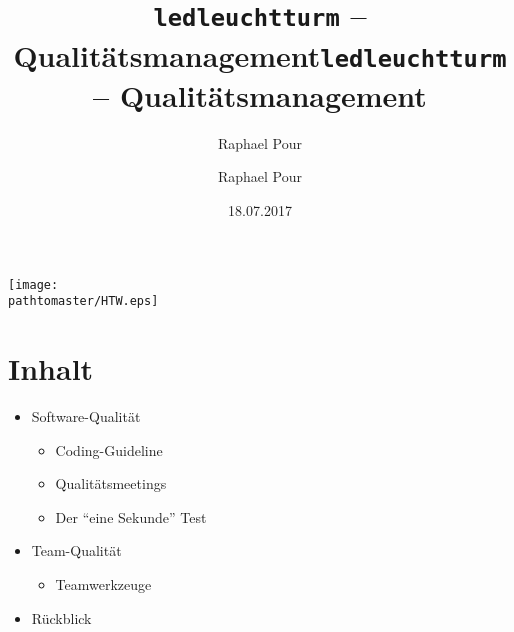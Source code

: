 \documentclass[ignorenonframetext, 11pt, table]{beamer}
\date{18.07.2017}
\author{Raphael Pour}
\title{\texttt{ledleuchtturm} -- Qualitätsmanagement}
\gdef\pathtomaster{../_LaTeX_master}
\begin{document}
\author{Raphael Pour}
\title{\texttt{ledleuchtturm} -- Qualitätsmanagement}
\begin{frame}[plain]
\begin{center}
\texttt{[image: \\pathtomaster/HTW.eps]}
\end{center}
\maketitle
\end{frame}
%
%
\section{Inhalt}
\begin{frame}
\begin{itemize}
    \item
Software-Qualität 
\begin{itemize}
\setlength\itemsep{0.2em}
    \item<2-> Coding-Guideline
    \item<3-> Qualitätsmeetings
    \item<4-> Der "`eine Sekunde"' Test
\end{itemize}
\item 
Team-Qualität
\begin{itemize}
\setlength\itemsep{0.2em}
    \item<5-> Teamwerkzeuge
\end{itemize}
    \item<6-> Rückblick
\end{itemize}
\end{frame}
\end{document}
